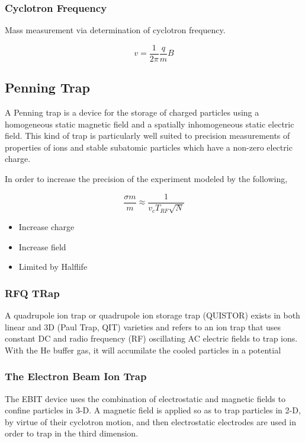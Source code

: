 \documentclass[english, 11pt]{article}
\begin{document}
\subsubsection{Cyclotron Frequency}

Mass measurement via determination of cyclotron frequency.

\[ v = \frac{1}{2\pi}\frac{q}{m}B\]

\subsection{Penning Trap}

A Penning trap is a device for the storage of charged particles using a homogeneous static magnetic field and a spatially inhomogeneous static electric field. This kind of trap is particularly well suited to precision measurements of properties of ions and stable subatomic particles which have a non-zero electric charge.

\begin{defn}
In order to increase the precision of the experiment modeled by the following,

\[ \frac{\sigma m}{m} \approx \frac{1}{v_cT_{RF}\sqrt{N}}\]

\begin{itemize}
  \item Increase charge
  \item Increase field
  \item Limited by Halflife
\end{itemize}
\end{defn}

\subsubsection{RFQ TRap}

A quadrupole ion trap or quadrupole ion storage trap (QUISTOR) exists in both linear and 3D (Paul Trap, QIT) varieties and refers to an ion trap that uses constant DC and radio frequency (RF) oscillating AC electric fields to trap ions.
With the He buffer gas, it will accumilate the cooled particles in a potential

\subsubsection{The Electron Beam Ion Trap}

The EBIT device uses the combination of electrostatic and magnetic fields to confine particles in 3-D. A magnetic field is applied so as to trap particles in 2-D, by virtue of their cyclotron motion, and then electrostatic electrodes are used in order to trap in the third dimension.
\end{document}
